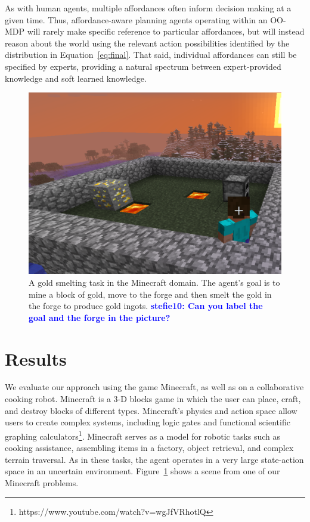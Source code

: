 \documentclass[letterpaper]{article}
\newcommand{\stnote}[1]{\textcolor{Blue}{\textbf{stefie10: #1}}}
\begin{document}
As with human agents, multiple affordances often inform decision
making at a given time.  Thus, affordance-aware planning agents
operating within an OO-MDP will rarely make specific reference to
particular affordances, but will instead reason about the world using
the relevant action possibilities identified by the distribution in
Equation~\ref{eq:final}.  That said, individual affordances can still
be specified by experts, providing a natural spectrum between
expert-provided knowledge and soft learned knowledge.

  
\begin{figure}
\centering
\includegraphics[scale=0.11]{figures/smelting.png}%
  \caption{A gold smelting task in the Minecraft domain.  The agent's
    goal is to mine a block of gold, move to the forge and then smelt
    the gold in the forge to produce gold ingots.  \stnote{Can you
      label the goal and the forge in the picture?}  }
  \label{fig:minecraft}
\end{figure}


\section{Results}
\label{sec:results}

We evaluate our approach using the game Minecraft, as well as on a
collaborative cooking robot.  Minecraft is a 3-D blocks game in which
the user can place, craft, and destroy blocks of different types.
Minecraft's physics and action space allow users to create complex
systems, including logic gates and functional scientific graphing
calculators\footnote{https://www.youtube.com/watch?v=wgJfVRhotlQ}.
Minecraft serves as a model for robotic tasks such as cooking
assistance, assembling items in a factory, object retrieval, and
complex terrain traversal.  As in these tasks, the agent operates in a
very large state-action space in an uncertain environment.
Figure~\ref{fig:minecraft} shows a scene from one of our Minecraft
problems.
\end{document}
